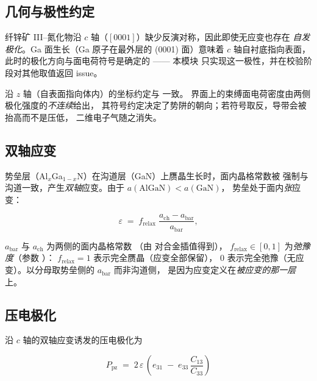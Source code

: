 \subsection{几何与极性约定}
\label{sec:pol-geometry}

纤锌矿 III--氮化物沿 $c$ 轴（$[0001]$）缺少反演对称，因此即使无应变也存在
\emph{自发极化}。Ga 面生长（Ga 原子在最外层的 (0001) 面）意味着
$c$ 轴自衬底指向表面，此时的极化方向与面电荷符号是确定的 —— 本模块
只实现这一极性，并在校验阶段对其他取值返回  issue。

沿 $z$ 轴（自表面指向体内）的坐标约定与  一致。
界面上的束缚面电荷密度由两侧极化强度的\emph{不连续}给出，
其符号约定决定了势阱的朝向；若符号取反，导带会被抬高而不是压低，
二维电子气随之消失。

\subsection{双轴应变}
\label{sec:pol-strain}

势垒层（Al$_x$Ga$_{1-x}$N）在沟道层（GaN）上赝晶生长时，面内晶格常数被
强制与沟道一致，产生\emph{双轴}应变。由于 $a(\text{AlGaN}) < a(\text{GaN})$，
势垒处于面内\emph{张}应变：

\begin{equation}
\varepsilon \;=\; f_{\text{relax}}\;
\frac{a_{\text{ch}} - a_{\text{bar}}}{a_{\text{bar}}} ,
\label{eq:strain}
\end{equation}

$a_{\text{bar}}$ 与 $a_{\text{ch}}$ 为两侧的面内晶格常数
（由  对合金插值得到），
$f_{\text{relax}}\in[0,1]$ 为\emph{弛豫度}（参数 ）：
$f_{\text{relax}}=1$ 表示完全赝晶（应变全部保留），
$0$ 表示完全弛豫（无应变）。以分母取势垒侧的 $a_{\text{bar}}$ 而非沟道侧，
是因为应变定义在\emph{被应变的那一层}上。

\subsection{压电极化}
\label{sec:pol-piezo}

沿 $c$ 轴的双轴应变诱发的压电极化为

\begin{equation}
\boxed{\;
P_{\text{pz}} \;=\; 2\,\varepsilon\,
\left(e_{31} \;-\; e_{33}\,\frac{C_{13}}{C_{33}}\right)
\;}
\label{eq:piezo}
\end{equation}

